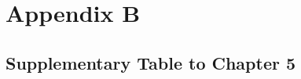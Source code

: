 \setlength{\headheight}{1.2cm}
\renewcommand{\publ}{\flushleft\footnotesize{}}

\chapter*{Appendix B}\label{app:B}
\renewcommand{\thesection}{B.\arabic{section}}
\renewcommand{\thetable}{B.\arabic{table}}


\section{Supplementary Table to Chapter 5}
